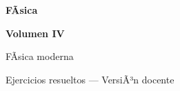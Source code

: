 ﻿\documentclass[11pt,letterpaper,openany]{book}
\newcommand{\numerovolumen}{IV}
\newcommand{\nombrevolumen}{FÃ­sica moderna}
\begin{document}

\begin{titlepage}

    \centering

    \vspace*{2.5cm}

    {\color{RojoPrincipal}
    \Huge\bfseries
    FÃ­sica
    \par}

    \vspace{0.8cm}

    {\color{AzulPrincipal}
    \LARGE\bfseries
    Volumen \numerovolumen
    \par}

    \vspace{0.5cm}

    {\Large
    \nombrevolumen
    \par}

    \vspace{1.5cm}

    {\color{AzulPrincipal}
    \Large
    Ejercicios resueltos --- VersiÃ³n docente
    \par}

    \vfill

    {\Large\bfseries
    \autorlibro
    \par}

    \vspace{2cm}

\end{titlepage}



\frontmatter

\tableofcontents

\cleardoublepage



\mainmatter
\end{document}
